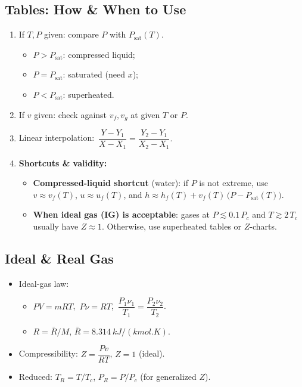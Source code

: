 \documentclass[10pt]{article}
\begin{document}
\begin{multicols}{2}
\subsection{Tables: How \& When to Use}
\begin{enumerate}
    \item If $T,P$ given: compare $P$ with $P_{\text{sat}}(T)$.
    \begin{itemize}
        \item $P>P_{\text{sat}}$: compressed liquid;
        \item $P=P_{\text{sat}}$: saturated (need $x$);
        \item $P<P_{\text{sat}}$: superheated.
    \end{itemize}
    \item If $v$ given: check against $v_f,v_g$ at given $T$ or $P$.
    \item Linear interpolation:\ $
        \dfrac{Y-Y_1}{X-X_1}=\dfrac{Y_2-Y_1}{X_2-X_1}.
    $
    \item \textbf{Shortcuts \& validity:}
    \begin{itemize}
        \item \textbf{Compressed-liquid shortcut} (water): if $P$ is not extreme, use $v\!\approx v_f(T)$, $u\!\approx u_f(T)$, and $h\!\approx h_f(T)+v_f(T)\,\big(P-P_{\text{sat}}(T)\big)$.
        \item \textbf{When ideal gas (IG) is acceptable}: gases at $P \lesssim 0.1\,P_c$ and $T \gtrsim 2\,T_c$ usually have $Z\approx 1$. Otherwise, use superheated tables or $Z$-charts.
    \end{itemize}
\end{enumerate}

\subsection{Ideal \& Real Gas}
\begin{itemize}
    \item Ideal-gas law:
    \begin{itemize}
        \item $PV=mRT$,\ $P\nu=RT$,\ $\dfrac{P_1\nu_1}{T_1}=\dfrac{P_2\nu_2}{T_2}$.
        \item $R=\bar R/M$, $\bar R=\SI{8.314}{kJ/(kmol.K)}$.
    \end{itemize}
    \item Compressibility: $Z=\dfrac{P v}{RT}$, $Z{=}1$ (ideal).
    \item Reduced: $T_R{=}T/T_c$, $P_R{=}P/P_c$ (for generalized $Z$).
\end{itemize}


\end{multicols}
\end{document}
